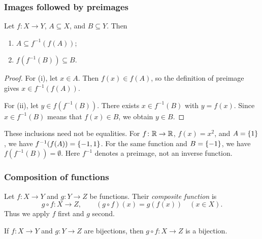 \documentclass[11pt,a4paper]{amsart}
\begin{document}
\subsubsection{Images followed by preimages}

\begin{theorem}
  Let \(f\colon X \to Y\), \(A \subseteq X\), and \(B \subseteq Y\).
  Then
  \begin{enumerate}[label=(\roman*)]
    \item \(A \subseteq f^{-1}(f(A))\);
    \item \(f(f^{-1}(B)) \subseteq B\).
  \end{enumerate}
\end{theorem}

\begin{proof}
  For (i), let \(x \in A\). Then \(f(x) \in f(A)\), so the
  definition of preimage gives \(x \in f^{-1}(f(A))\).

  For (ii), let \(y \in f(f^{-1}(B))\). There exists
  \(x \in f^{-1}(B)\) with \(y=f(x)\). Since \(x \in f^{-1}(B)\)
  means that \(f(x) \in B\), we obtain \(y \in B\).
\end{proof}

\begin{remark}
  These inclusions need not be equalities. For \(f\colon\mathbb{R}\to\mathbb{R}\),
  \(f(x)=x^2\), and \(A=\left\lbrace1\right\rbrace\), we have
  \(f^{-1}(f(A))=\left\lbrace-1,1\right\rbrace\). For the same function and
  \(B=\left\lbrace-1\right\rbrace\), we have \(f(f^{-1}(B))=\emptyset\).
  Here \(f^{-1}\) denotes a preimage, not an inverse function.
\end{remark}

\subsubsection{Composition of functions}

\begin{definition}
  Let \(f\colon X \to Y\) and \(g\colon Y \to Z\) be functions.
  Their \emph{composite function} is
  \[
    g\circ f\colon X\to Z,
    \qquad (g\circ f)(x)=g(f(x)) \quad (x\in X).
  \]
  Thus we apply \(f\) first and \(g\) second.
\end{definition}

\begin{theorem}\label{thm:composition-bijections}
  If \(f\colon X\to Y\) and \(g\colon Y\to Z\) are bijections,
  then \(g\circ f\colon X\to Z\) is a bijection.
\end{theorem}
\end{document}
